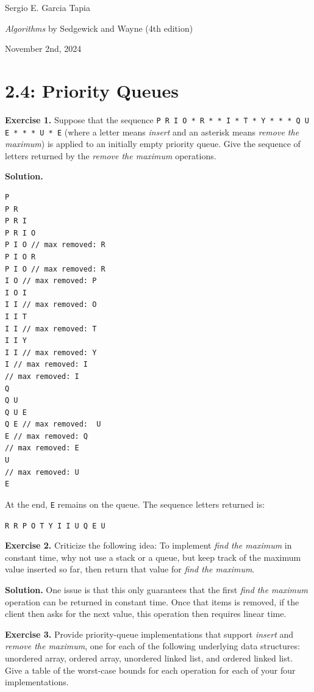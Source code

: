 \documentclass[12pt, a4paper]{article}
\newenvironment{ex}[2][Exercise]
{\par\medskip\noindent \textbf{#1 #2.}}
{\medskip}
\newenvironment{sol}[1][Solution]
{\par\medskip\noindent \textbf{#1.} }
{\medskip}
\begin{document}
	\noindent Sergio E. Garcia Tapia \hfill
	
	\noindent \emph{Algorithms} by Sedgewick and Wayne (4th edition) \cite{sedgewick_wayne}\hfill
	
	\noindent November 2nd, 2024\hfill 
	\section*{2.4: Priority Queues}
	\begin{ex}{1}
		Suppose that the sequence \texttt{P R I O * R * * I * T * Y * * * Q U E * * * U * E}
		(where a letter means \emph{insert} and an asterisk means \emph{remove the maximum})
		is applied to an initially empty priority queue. Give the sequence of letters
		returned by the \emph{remove the maximum} operations.
	\end{ex}
	\begin{sol}
		\begin{lstlisting}[language={}]
P
P R
P R I
P R I O
P I O // max removed: R
P I O R
P I O // max removed: R
I O // max removed: P
I O I
I I // max removed: O
I I T
I I // max removed: T
I I Y
I I // max removed: Y
I // max removed: I
// max removed: I
Q
Q U
Q U E
Q E // max removed:  U
E // max removed: Q
// max removed: E
U
// max removed: U
E
		\end{lstlisting}
		At the end, \texttt{E} remains on the queue. The sequence letters returned is:
		\begin{center}
			\texttt{R R P O T Y I I U Q E U}
		\end{center}
	\end{sol}
	\begin{ex}{2}
		Criticize the following idea: To implement \emph{find the maximum} in constant
		time, why not use a stack  or a queue, but keep track of the maximum value inserted
		so far, then return that value for \emph{find the maximum}.
	\end{ex}
	\begin{sol}
		One issue is that this only guarantees that the first \emph{find the maximum}
		operation can be returned in constant time. Once that items is removed, if the client
		then asks for the next value, this operation then requires linear time.
	\end{sol}
	\begin{ex}{3}
		Provide priority-queue implementations that support \emph{insert} and
		\emph{remove the maximum}, one for each of the following underlying data structures:
		unordered array, ordered array, unordered linked list, and ordered linked list.
		Give a table of the worst-case bounds for each operation for each of your
		four implementations.
	\end{ex}
\end{document}
